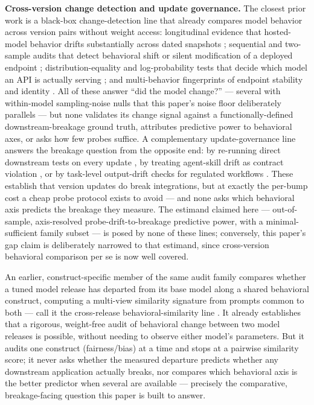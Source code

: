 \documentclass[11pt]{article}
\begin{document}
\textbf{Cross-version change detection and update governance.} The closest prior work is a black-box change-detection line that already compares model behavior across version pairs without weight access: longitudinal evidence that hosted-model behavior drifts substantially across dated snapshots \citep{ChenDrift2307}; sequential and two-sample audits that detect behavioral shift or silent modification of a deployed endpoint \citep{AuditBehaviorShift2410,YouveChanged2504,RankUniformity2506}; distribution-equality and log-probability tests that decide which model an API is actually serving \citep{ModelEquality2410,LogProbTracking2512,ModelSubstitution2504}; and multi-behavior fingerprints of endpoint stability and identity \citep{BehavioralFingerprints2603}. All of these answer ``did the model change?'' --- several with within-model sampling-noise nulls that this paper's noise floor deliberately parallels \citep{ModelEquality2410,RankUniformity2506} --- but none validates its change signal against a functionally-defined downstream-breakage ground truth, attributes predictive power to behavioral axes, or asks how few probes suffice. A complementary update-governance line answers the breakage question from the opposite end: by re-running direct downstream tests on every update \citep{TestBeforeDeploy2604}, by treating agent-skill drift as contract violation \citep{SkillDriftContract2605}, or by task-level output-drift checks for regulated workflows \citep{LLMOutputDrift2511}. These establish that version updates do break integrations, but at exactly the per-bump cost a cheap probe protocol exists to avoid --- and none asks which behavioral axis predicts the breakage they measure. The estimand claimed here --- out-of-sample, axis-resolved probe-drift-to-breakage predictive power, with a minimal-sufficient family subset --- is posed by none of these lines; conversely, this paper's gap claim is deliberately narrowed to that estimand, since cross-version behavioral comparison per se is now well covered.

An earlier, construct-specific member of the same audit family compares whether a tuned model release has departed from its base model along a shared behavioral construct, computing a multi-view similarity signature from prompts common to both --- call it the cross-release behavioral-similarity line \citep{BiasSimBSM2607}. It already establishes that a rigorous, weight-free audit of behavioral change between two model releases is possible, without needing to observe either model's parameters. But it audits one construct (fairness/bias) at a time and stops at a pairwise similarity score; it never asks whether the measured departure predicts whether any downstream application actually breaks, nor compares which behavioral axis is the better predictor when several are available --- precisely the comparative, breakage-facing question this paper is built to answer.
\end{document}
